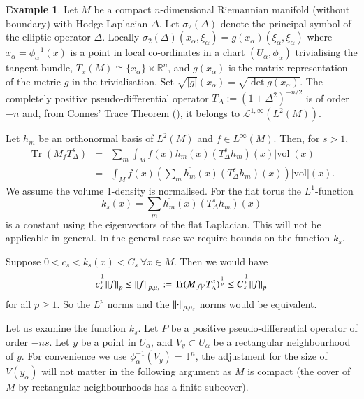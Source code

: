 \documentclass[final,1p]{elsarticle}
\numberwithin{equation}{section}
\theoremstyle{plain}
\theoremstyle{definition}
\newtheorem{ex}[thm]{Example}
\begin{document}
\begin{ex} \label{ex:compact_M}
Let $M$ be a compact $n$-dimensional Riemannian manifold (without boundary) with Hodge Laplacian $\Delta$.
Let $\sigma_2(\Delta)$ denote the principal symbol
of the elliptic operator $\Delta$.  Locally
$\sigma_2(\Delta)(x_\alpha,\xi_\alpha) = g(x_\alpha)(\xi_\alpha,\xi_\alpha)$
where $x_\alpha = \phi_\alpha^{-1}(x)$ is a point in local co-ordinates
in a chart $(U_\alpha,\phi_\alpha)$ trivialising the tangent bundle,
$T_{x}(M) \cong \{x_\alpha \} \times {\ensuremath{\mathbb{R}}}^n$, and $g(x_\alpha)$
is the matrix representation of the metric $g$
in the trivialisation.  Set
$\sqrt{|g|}(x_\alpha) = \sqrt{\det g(x_\alpha)}$.
The completely positive
pseudo-differential operator $T_\Delta := (1+\Delta^2)^{-n/2}$ is of order $-n$
and, from Connes' Trace Theorem (\cite{C3}), it belongs to $\mathcal{L}^{1,\infty}(L^2(M))$.

Let $h_m$ be an orthonormal basis of $L^2(M)$
and $f \in L^\infty(M)$.
Then, for $s > 1$,
\begin{eqnarray*}
\operatorname{Tr}(M_{f} T_\Delta^s)
& = & \sum_m \int_M f(x) \overline{h_m}(x)(T_\Delta^s h_m)(x) |\mathrm{vol}|(x) \\
& = & \int_M f(x) \left( \sum_m \overline{h_m}(x)(T_\Delta^s h_m)(x) \right) |\mathrm{vol}|(x) .
\end{eqnarray*}
We assume the volume 1-density is normalised.
For the flat torus the $L^1$-function
$$
k_s(x) = \sum_m \overline{h_m}(x)(T_\Delta^s h_m)(x)
$$
is a constant using the eigenvectors of the flat Laplacian.  
This will not be applicable in general.  In the general case
we require bounds on the function $k_s$.

Suppose $0 < c_s < k_s(x) < C_s \ {\ensuremath{\forall}} x \in M$.  Then we would have
$$
c_s^{\frac{1}{p}} {\mbox{\ensuremath{\| {f} \|}}}_p \leq {\mbox{\ensuremath{\| {f} \|}}}_{p,\mu_s}
:= \operatorname{Tr}(M_{|f|^p} T_\Delta^s)^{\frac{1}{p}}
\leq C_s^{\frac{1}{p}} {\mbox{\ensuremath{\| {f} \|}}}_p
$$
for all $p \geq 1$.  So the $L^p$ norms
and the ${\mbox{\ensuremath{\| {\cdot} \|}}}_{p,\mu_s}$ norms would be equivalent.

Let us examine the function $k_s$.  Let $P$ be a positive pseudo-differential operator of order $-ns$.
Let $y$ be a point in $U_\alpha$,
and $V_y \subset U_\alpha$ be a
rectangular neighbourhood of $y$.
For convenience we use $\phi_\alpha^{-1}(V_y) = {\ensuremath{\mathbb{T}}}^n$,
the adjustment for the size of $V(y_\alpha)$
will not matter in the following argument
as $M$ is compact (the cover of $M$ by rectangular
neighbourhoods has a finite subcover).


\end{ex}
\end{document}
